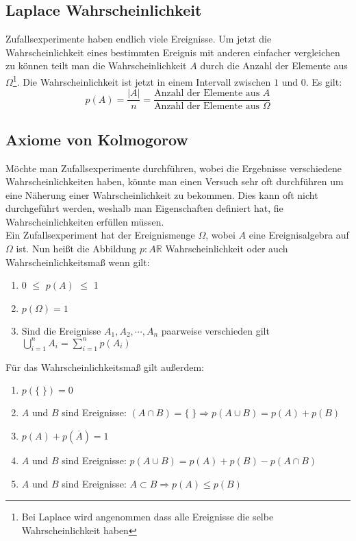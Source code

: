 \documentclass[a4paper]{scrartcl}
\begin{document}
        \subsection{Laplace Wahrscheinlichkeit}
            Zufallsexperimente haben endlich viele Ereignisse. Um jetzt die Wahrscheinlichkeit eines bestimmten Ereignis mit anderen einfacher vergleichen zu können
            teilt man die Wahrscheinlichkeit \(A\) durch die Anzahl der Elemente aus \(\Omega\)\footnote{Bei Laplace wird angenommen dass alle Ereignisse die selbe Wahrscheinlichkeit haben}.
            Die Wahrscheinlichkeit ist jetzt in einem Intervall zwischen \(1\) und \(0\). Es gilt:
            \begin{equation*}
                p(A) = \frac{|A|}{n} = \frac{\text{Anzahl der Elemente aus }A}{\text{Anzahl der Elemente aus } \Omega}
            \end{equation*}
        \subsection{Axiome von Kolmogorow}
            Möchte man Zufallsexperimente durchführen, wobei die Ergebnisse verschiedene Wahrscheinlichkeiten haben, könnte man einen Versuch sehr oft durchführen um eine Näherung 
            einer Wahrscheinlichkeit zu bekommen. Dies kann oft nicht durchgeführt werden, weshalb man Eigenschaften definiert hat, fie Wahrscheinlichkeiten erfüllen müssen. \\
            Ein Zufallsexperiment hat der Ereignismenge \(\Omega\), wobei  \(A\) eine Ereignisalgebra auf \(\Omega\) ist. Nun heißt die Abbildung \(p: A \mathbb{R} \) Wahrscheinlichkeit oder
            auch Wahrscheinlichkeitsmaß wenn gilt:
            \begin{enumerate}
                \item 0 \(\le\) \(p(A)\) \(\le\) 1
                \item \(p(\Omega) = 1\)
                \item Sind die Ereignisse \(A_1,A_2,\cdots,A_n\) paarweise verschieden gilt \(\bigcup\limits_{i=1}^{n} A_i = \sum\limits_{i=1}^n p(A_i) \)
            \end{enumerate} 
            Für das Wahrscheinlichkeitsmaß gilt außerdem: 
            \begin{enumerate}[label=\alph*)]
                \item \(p(\{ \; \}) = 0\)
                \item \(A\) und \(B\) sind Ereignisse: \((A \cap B) = \{ \; \}  \Rightarrow p( A \cup B) = p(A) + p(B)\)
                \item \(p(A) + p(\overline{A}) = 1\)
                \item \(A\) und \(B\) sind Ereignisse: \(p(A \cup B) = p(A) + p(B) - p(A \cap B)\)
                \item \(A\) und \(B\) sind Ereignisse: \(A \subset B \Rightarrow p(A) \le p(B)\)
            \end{enumerate}
\end{document}
